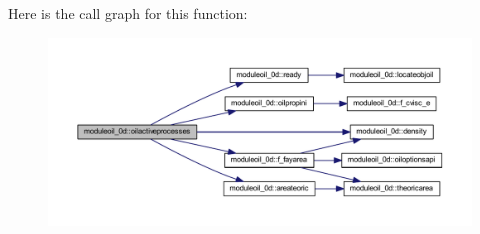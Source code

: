 Here is the call graph for this function\+:\nopagebreak
\begin{figure}[H]
\begin{center}
\leavevmode
\includegraphics[width=350pt]{namespacemoduleoil__0d_a555da7465f065b530285f2a3661690f9_cgraph}
\end{center}
\end{figure}
\mbox{\label{namespacemoduleoil__0d_acfea99e694d76e1358d2a688a3d50d98}} 
